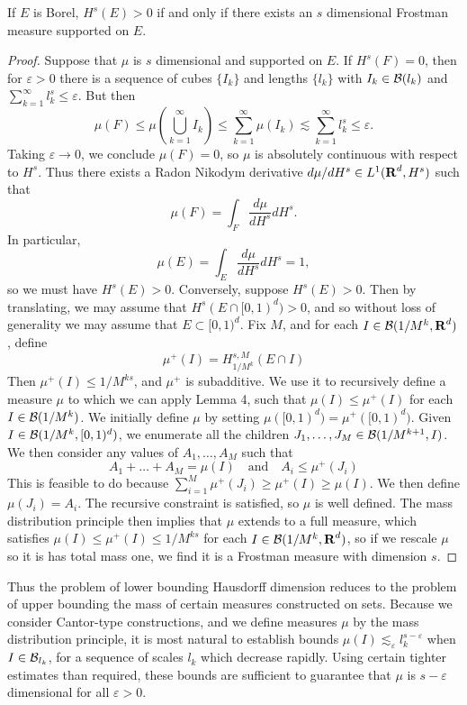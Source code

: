 \begin{lemma}
	If $E$ is Borel, $H^s(E) > 0$ if and only if there exists an $s$ dimensional Frostman measure supported on $E$.
\end{lemma}
\begin{proof}
	Suppose that $\mu$ is $s$ dimensional and supported on $E$. If $H^s(F) = 0$, then for $\varepsilon > 0$ there is a sequence of cubes $\{ I_k \}$ and lengths $\{ l_k \}$ with $I_k \in \operatorname{\mathcal{B}}(l_k)$ and $\sum_{k = 1}^\infty l_k^s \leq \varepsilon$. But then
	\[ \mu(F) \leq \mu \left( \bigcup_{k = 1}^\infty I_k \right) \leq \sum_{k = 1}^\infty \mu(I_k) \lesssim \sum_{k = 1}^\infty l_k^s \leq \varepsilon. \]
	Taking $\varepsilon \to 0$, we conclude $\mu(F) = 0$, so $\mu$ is absolutely continuous with respect to $H^s$. Thus there exists a Radon Nikodym derivative $d\mu/dH^s \in L^1(\operatorname{\mathbf{R}}^d,H^s)$ such that
	\[ \mu(F) = \int_F \frac{d\mu}{dH^s} dH^s. \]
	In particular,
	\[ \mu(E) = \int_E \frac{d\mu}{dH^s} dH^s = 1, \]
	so we must have $H^s(E) > 0$. Conversely, suppose $H^s(E) > 0$. Then by translating, we may assume that $H^s(E \cap [0,1)^d) > 0$, and so without loss of generality we may assume that $E \subset [0,1)^d$. Fix $M$, and for each $I \in \operatorname{\mathcal{B}}(1/M^k,\operatorname{\mathbf{R}}^d)$, define
	\[ \mu^+(I) = H^{s,M}_{1/M^k}(E \cap I) \]
	Then $\mu^+(I) \leq 1/M^{ks}$, and $\mu^+$ is subadditive. We use it to recursively define a measure $\mu$ to which we can apply Lemma 4, such that $\mu(I) \leq \mu^+(I)$ for each $I \in \operatorname{\mathcal{B}}(1/M^k)$. We initially define $\mu$ by setting $\mu([0,1)^d) = \mu^+([0,1)^d)$. Given $I \in \operatorname{\mathcal{B}}(1/M^k,[0,1)^d)$, we enumerate all the children $J_1, \dots, J_M \in \operatorname{\mathcal{B}}(1/M^{k+1},I)$. We then consider any values of $A_1, \dots, A_M$ such that
	\[ A_1 + \dots + A_M = \mu(I)\quad\text{and}\quad A_i \leq \mu^+(J_i) \]
	This is feasible to do because $\sum_{i = 1}^M \mu^+(J_i) \geq \mu^+(I) \geq \mu(I)$. We then define $\mu(J_i) = A_i$. The recursive constraint is satisfied, so $\mu$ is well defined. The mass distribution principle then implies that $\mu$ extends to a full measure, which satisfies $\mu(I) \leq \mu^+(I) \leq 1/M^{ks}$ for each $I \in \operatorname{\mathcal{B}}(1/M^k,\operatorname{\mathbf{R}}^d)$, so if we rescale $\mu$ so it is has total mass one, we find it is a Frostman measure with dimension $s$.
\end{proof}

Thus the problem of lower bounding Hausdorff dimension reduces to the problem of upper bounding the mass of certain measures constructed on sets. Because we consider Cantor-type constructions, and we define measures $\mu$ by the mass distribution principle, it is most natural to establish bounds $\mu(I) \lesssim_\varepsilon l_k^{s - \varepsilon}$ when $I \in \operatorname{\mathcal{B}}_{l_k}$, for a sequence of scales $l_k$ which decrease rapidly. Using certain tighter estimates than required, these bounds are sufficient to guarantee that $\mu$ is $s - \varepsilon$ dimensional for all $\varepsilon > 0$.











